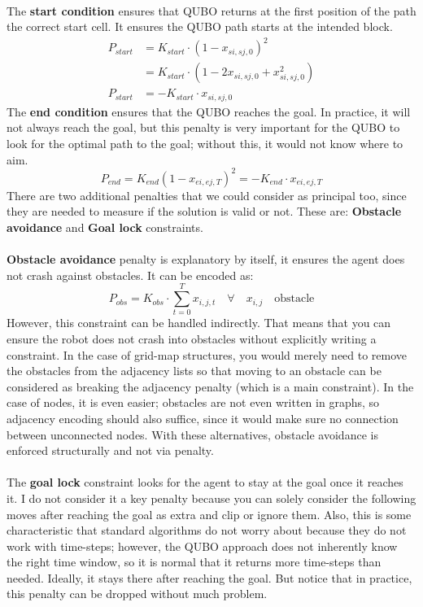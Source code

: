 \documentclass[11pt]{article}
\begin{document}
\\
The \textbf{start condition} ensures that QUBO returns at the first position of the path the correct start cell. It ensures the QUBO path starts at the intended block.
\[
\begin{aligned}
P_{start}&=K_{start} \cdot (1-x_{si,sj,0})^2 \\
&= K_{start} \cdot(1-2x_{si,sj,0}+x_{si,sj,0}^2) \\
P_{start} &= -K_{start} \cdot x_{si,sj,0}
\end{aligned}
\]
The \textbf{end condition} ensures that the QUBO reaches the goal. In practice, it will not always reach the goal, but this penalty is very important for the QUBO to look for the optimal path to the goal; without this, it would not know where to aim.
\[
P_{end}=K_{end}(1-x_{ei,ej,T})^2 = -K_{end} \cdot x_{ei,ej,T}
\]
There are two additional penalties that we could consider as principal too, since they are needed to measure if the solution is valid or not. These are: \textbf{Obstacle avoidance} and \textbf{Goal lock} constraints.\\
\\
\textbf{Obstacle avoidance} penalty is explanatory by itself, it ensures the agent does not crash against obstacles. It can be encoded as: 
\[
P_{obs}=K_{obs} \cdot\sum_{t=0}^T x_{i,j,t} \quad \forall \quad x_{i,j} \quad \text{obstacle} 
\]
However, this constraint can be handled indirectly. That means that you can ensure the robot does not crash into obstacles without explicitly writing a constraint. In the case of grid-map structures, you would merely need to remove the obstacles from the adjacency lists so that moving to an obstacle can be considered as breaking the adjacency penalty (which is a main constraint). In the case of nodes, it is even easier; obstacles are not even written in graphs, so adjacency encoding should also suffice, since it would make sure no connection between unconnected nodes. With these alternatives, obstacle avoidance is enforced structurally and not via penalty.\\
\\
The \textbf{goal lock} constraint looks for the agent to stay at the goal once it reaches it. I do not consider it a key penalty because you can solely consider the following moves after reaching the goal as extra and clip or ignore them. Also, this is some characteristic that standard algorithms do not worry about because they do not work with time-steps; however, the QUBO approach does not inherently know the right time window, so it is normal that it returns more time-steps than needed. Ideally, it stays there after reaching the goal. But notice that in practice, this penalty can be dropped without much problem.
\end{document}
